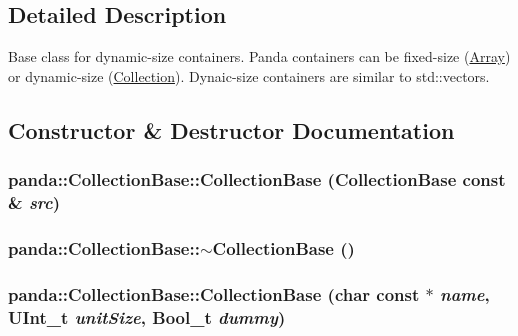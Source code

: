 \subsection{Detailed Description}
Base class for dynamic-\/size containers. Panda containers can be fixed-\/size (\hyperlink{classpanda_1_1Array}{Array}) or dynamic-\/size (\hyperlink{classpanda_1_1Collection}{Collection}). Dynaic-\/size containers are similar to std::vectors. 

\subsection{Constructor \& Destructor Documentation}
\hypertarget{classpanda_1_1CollectionBase_a6e30b7cb32f9e4c46c4ce96bb0ccff2e}{
\subsubsection[{CollectionBase}]{\setlength{\rightskip}{0pt plus 5cm}panda::CollectionBase::CollectionBase ({\bf CollectionBase} const \& {\em src})}}
\label{classpanda_1_1CollectionBase_a6e30b7cb32f9e4c46c4ce96bb0ccff2e}
\hypertarget{classpanda_1_1CollectionBase_a56858ddc5cafa8233daec30c0ad2769a}{
\subsubsection[{$\sim$CollectionBase}]{\setlength{\rightskip}{0pt plus 5cm}panda::CollectionBase::$\sim$CollectionBase ()}}
\label{classpanda_1_1CollectionBase_a56858ddc5cafa8233daec30c0ad2769a}
\hypertarget{classpanda_1_1CollectionBase_a4037f99dc89bcd8f3e89bea5fbec3a2c}{
\subsubsection[{CollectionBase}]{\setlength{\rightskip}{0pt plus 5cm}panda::CollectionBase::CollectionBase (char const $\ast$ {\em name}, \/  UInt\_\-t {\em unitSize}, \/  Bool\_\-t {\em dummy})}}
\label{classpanda_1_1CollectionBase_a4037f99dc89bcd8f3e89bea5fbec3a2c}


